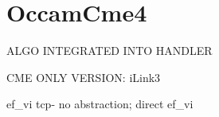\chapter{Occam\+Cme4}
\hypertarget{md__r_e_a_d_m_e}{}\label{md__r_e_a_d_m_e}
\label{md__r_e_a_d_m_e_autotoc_md0}%
%


ALGO INTEGRATED INTO HANDLER

CME ONLY VERSION\+: i\+Link3

ef\+\_\+vi tcp-\/ no abstraction; direct ef\+\_\+vi 